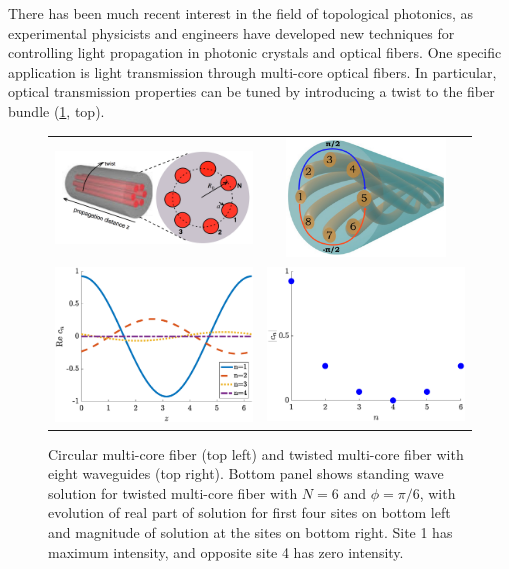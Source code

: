 \documentclass[12pt,reqno,oneside,hidelinks]{article}
\begin{document}
There has been much recent interest in the field of topological photonics, as experimental physicists and engineers have developed new techniques for controlling light propagation in photonic crystals and optical fibers. One specific application is light transmission through multi-core optical fibers. In particular, optical transmission properties can be tuned by introducing a twist to the fiber bundle \cite{Longhi2016,CastroCastro2016,Parto2017} (\cref{fig:twist}, top).
\begin{figure}
\begin{center}
\begin{tabular}{cc}
\includegraphics[width=7cm]{images/twist2.png} &
\includegraphics[width=4.25cm]{images/twistmulticore.png} \\
\includegraphics[width=7cm]{images/evenholestandingwave.eps} &
\includegraphics[width=7cm]{images/evenholeamps.eps}
\end{tabular}
\end{center}
\caption{Circular multi-core fiber \cite{Longhi2016} (top left) and twisted multi-core fiber with eight waveguides \cite{Parto2017} (top right). Bottom panel shows standing wave solution for twisted multi-core fiber with $N = 6$ and $\phi = \pi/6$, with evolution of real part of solution for first four sites on bottom left and magnitude of solution at the sites on bottom right. Site 1 has maximum intensity, and opposite site 4 has zero intensity.}
\label{fig:twist}
\end{figure}
\end{document}
